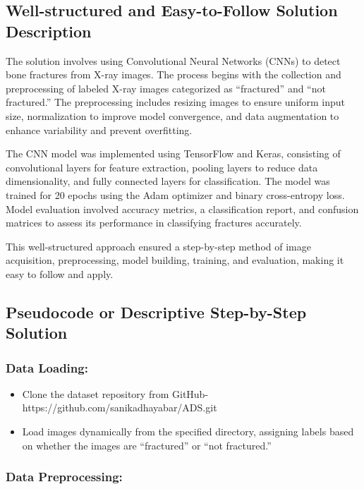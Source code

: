 \documentclass[11pt]{article}
\providecommand{\tightlist}{%
      \setlength{\itemsep}{0pt}\setlength{\parskip}{0pt}}
\begin{document}
\subsection*{ Well-structured and Easy-to-Follow Solution
Description}\label{well-structured-and-easy-to-follow-solution-description}

The solution involves using Convolutional Neural Networks (CNNs) to
detect bone fractures from X-ray images. The process begins with the
collection and preprocessing of labeled X-ray images categorized as
``fractured'' and ``not fractured.'' The preprocessing includes resizing
images to ensure uniform input size, normalization to improve model
convergence, and data augmentation to enhance variability and prevent
overfitting.

The CNN model was implemented using TensorFlow and Keras, consisting of
convolutional layers for feature extraction, pooling layers to reduce
data dimensionality, and fully connected layers for classification. The
model was trained for 20 epochs using the Adam optimizer and binary
cross-entropy loss. Model evaluation involved accuracy metrics, a
classification report, and confusion matrices to assess its performance
in classifying fractures accurately.

This well-structured approach ensured a step-by-step method of image
acquisition, preprocessing, model building, training, and evaluation,
making it easy to follow and apply.

\subsection*{ Pseudocode or Descriptive Step-by-Step
Solution}\label{pseudocode-or-descriptive-step-by-step-solution}

\subsubsection*{Data Loading:}\label{data-loading}

\begin{itemize}
\tightlist
\item
  Clone the dataset repository from GitHub-
  https://github.com/sanikadhayabar/ADS.git
\item
  Load images dynamically from the specified directory, assigning labels
  based on whether the images are ``fractured'' or ``not fractured.''
\end{itemize}

\subsubsection*{Data Preprocessing:}\label{data-preprocessing}
\end{document}
